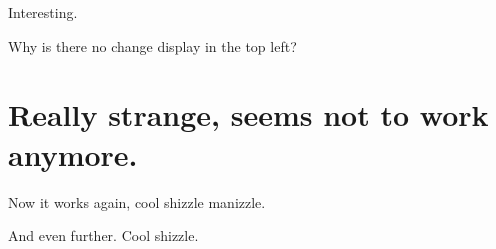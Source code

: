 Interesting.

Why is there no change display in the top left?

\section[really-strange-seems-not-to-work-anymore.]{Really strange,
seems not to work anymore.}

Now it works again, cool shizzle manizzle.

And even further. Cool shizzle.
